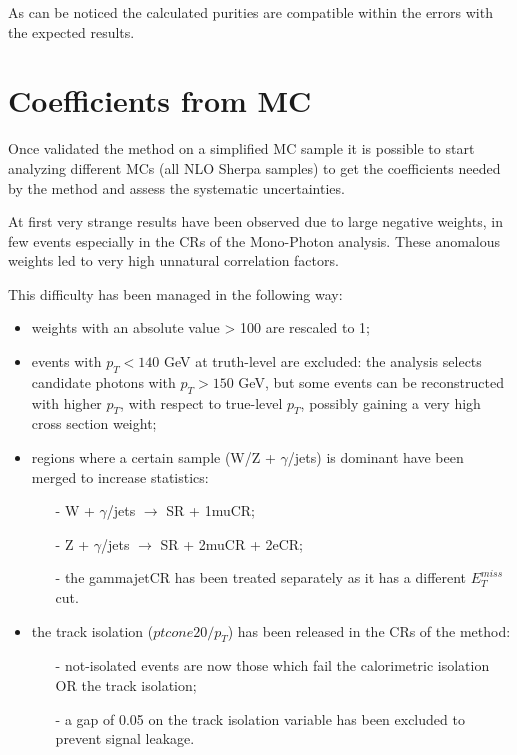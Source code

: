 \documentclass[11pt,a4paper,twoside,openright]{book}
\begin{document}
As can be noticed the calculated purities are compatible within the errors with the expected results.


\section{Coefficients from MC}

Once validated the method on a simplified MC sample it is possible to start analyzing different MCs (all NLO Sherpa samples) to get the coefficients needed by the method and assess the systematic uncertainties.


At first very strange results have been observed due to large negative weights, in few events especially in the CRs of the Mono-Photon analysis. These anomalous weights led to very high unnatural correlation factors.

This difficulty has been managed in the following way:

\begin{itemize}

    \item weights with an absolute value > 100 are rescaled to 1;
    
    \item events with $p_{T} < 140$ GeV at truth-level are excluded: the analysis selects candidate photons with $p_{T} > 150$ GeV, but some events can be reconstructed with higher $p_{T}$, with respect to true-level $p_{T}$, possibly gaining a very high cross section weight;

    \item regions where a certain sample (W/Z + $\gamma$/jets) is dominant have been merged to increase statistics:
    \begin{itemize}
    
        \item[-] W + $\gamma$/jets $\rightarrow$ SR + 1muCR;
        
        \item[-] Z + $\gamma$/jets $\rightarrow$ SR + 2muCR + 2eCR;
        
        \item[-] the gammajetCR has been treated separately as it has a different $E_{T}^{miss}$ cut.
        
    \end{itemize}
    
    \item the track isolation ($ptcone20/p_{T}$) has been released in the CRs of the method:
    \begin{itemize}
    
        \item[-] not-isolated events are now those which fail the calorimetric isolation OR the track isolation;
        
        \item[-] a gap of 0.05 on the track isolation variable has been excluded to prevent signal leakage.
    
    \end{itemize}
    
\end{itemize}
\end{document}
